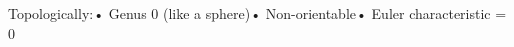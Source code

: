\documentclass[preview]{standalone}
\begin{document}
\begin{center}
Topologically:• Genus 0 (like a sphere)• Non-orientable• Euler characteristic = 0
\end{center}
\end{document}
